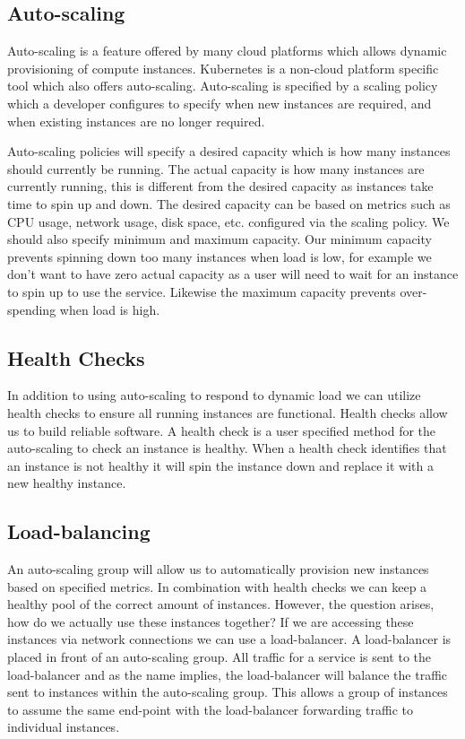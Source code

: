 \subsection{Auto-scaling}
Auto-scaling is a feature offered by many cloud platforms which allows dynamic provisioning of compute instances.
Kubernetes is a non-cloud platform specific tool which also offers auto-scaling.
Auto-scaling is specified by a scaling policy which a developer configures to specify when new instances are required, and when existing instances are no longer required.

Auto-scaling policies will specify a desired capacity which is how many instances should currently be running.
The actual capacity is how many instances are currently running,
this is different from the desired capacity as instances take time to spin up and down.
The desired capacity can be based on metrics such as CPU usage, network usage, disk space, etc. configured via the scaling policy.
We should also specify minimum and maximum capacity.
Our minimum capacity prevents spinning down too many instances when load is low, 
for example we don't want to have zero actual capacity as a user will need to wait for an instance to spin up to use the service.
Likewise the maximum capacity prevents over-spending when load is high.

\subsection{Health Checks}

In addition to using auto-scaling to respond to dynamic load we can utilize health checks to ensure all running instances are functional.
Health checks allow us to build reliable software.
A health check is a user specified method for the auto-scaling to check an instance is healthy.
When a health check identifies that an instance is not healthy it will spin the instance down and replace it with a new healthy instance.

\subsection{Load-balancing}

An auto-scaling group will allow us to automatically provision new instances based on specified metrics.
In combination with health checks we can keep a healthy pool of the correct amount of instances.
However, the question arises, how do we actually use these instances together?
If we are accessing these instances via network connections we can use a load-balancer.
A load-balancer is placed in front of an auto-scaling group.
All traffic for a service is sent to the load-balancer and as the name implies,
the load-balancer will balance the traffic sent to instances within the auto-scaling group.
This allows a group of instances to assume the same end-point with the load-balancer forwarding traffic to individual instances.


